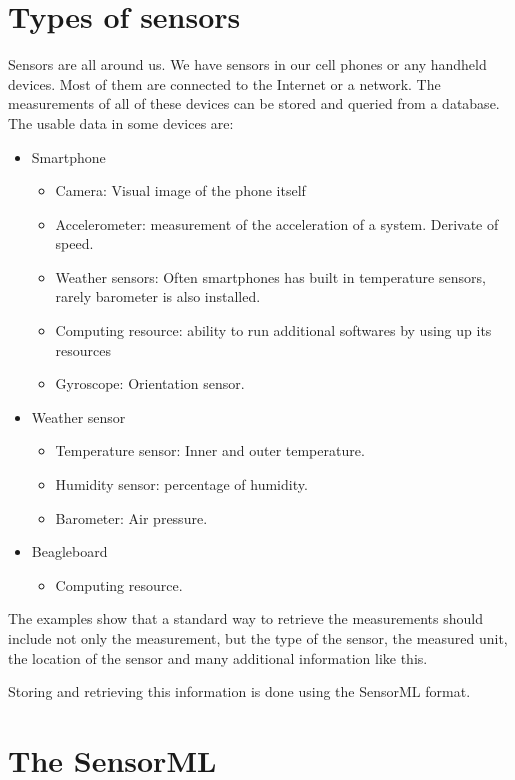  \section{Types of sensors}
 
 Sensors are all around us. We have sensors in our cell phones or any handheld devices. Most of them are connected to the Internet or a network. The measurements of all of these devices can be stored and queried from a database. The usable data in some devices are:
 
 \begin{itemize}
 	\item Smartphone
 	 \begin{itemize}
	 	 \item Camera: Visual image of the phone itself
	 	 \item Accelerometer: measurement of the acceleration of a system. Derivate of speed.
	 	 \item Weather sensors: Often smartphones has built in temperature sensors, rarely barometer is also installed.
	 	 \item Computing resource: ability to run additional softwares by using up its resources
	 	 \item Gyroscope: Orientation sensor.
 	 \end{itemize}
 	 \item Weather sensor
 	 \begin{itemize}
 	 \item Temperature sensor: Inner and outer temperature.
 	 \item Humidity sensor: percentage of humidity.
 	 \item Barometer: Air pressure.
 	 \end{itemize}
 	 \item Beagleboard
 	 \begin{itemize}
	\item Computing resource.
 	 \end{itemize}
 \end{itemize}

The examples show that a standard way to retrieve the measurements should include not only the measurement, but the type of the sensor, the measured unit, the location of the sensor and many additional information like this. 

Storing and retrieving this information is done using the SensorML format.

\section{The SensorML}


